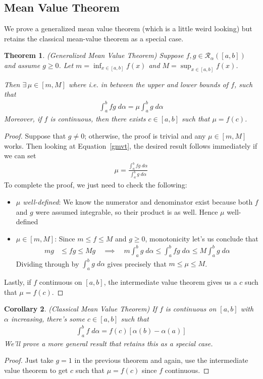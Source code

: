 \documentclass[12pt]{book}
\numberwithin{equation}{section} %
\theoremstyle{plain}
\newtheorem{thm}{Theorem}[section]
\newtheorem{cor}[thm]{Corollary}
\theoremstyle{definition}
\theoremstyle{remark}
\begin{document}
\newpage
\subsection{Mean Value Theorem}

We prove a generalized mean value theorem (which is a little weird
looking) but retains the classical mean-value theorem as a special case.

\begin{thm}\emph{(Generalized Mean Value Theorem)}
\label{mvt}
Suppose $f,g\in\mathscr{R}_\alpha([a,b])$ and assume $g\geq0$.
Let $m=\inf_{x\in[a,b]} f(x)$ and $M=\sup_{x\in[a,b]} f(x)$.

Then $\exists\,\mu\in[m,M]$ where i.e. in between the upper and lower
bounds of $f$, such that
\begin{align}
  \int^b_a fg\;d\alpha = \mu \int^b_a g\;d\alpha
  \label{gmvt}
\end{align}
Moreover, if $f$ is continuous, then there exists $c\in[a,b]$ such that
$\mu = f(c)$.
\end{thm}
\begin{proof}
Suppose that $g\neq 0$; otherwise, the proof is trivial and
any $\mu\in[m,M]$ works.
Then looking at Equation~\ref{gmvt}, the desired result follows
immediately if we can set
\begin{align*}
  \mu = \frac{\int^b_a fg\;d\alpha}{\int^b_a g\;d\alpha}
\end{align*}
To complete the proof, we just need to check the following:
\begin{itemize}
  \item
    \emph{$\mu$ well-defined}: We know the numerator and denominator
    exist because both $f$ and $g$ were assumed integrable, so their
    product is as well. Hence $\mu$ well-defined
  \item $\mu\in[m,M]$:
    Since $m\leq f \leq M$ and $g\geq0$, monotonicity let's us conclude
    that
    \begin{align}
      mg &\leq fg \leq Mg
      \quad\implies\quad
      m\int^b_a g\;d\alpha \leq
      \int^b_a fg\;d\alpha \leq  M \int^b_a g\;d\alpha
      \label{gmvtineq}
    \end{align}
    Dividing through by $\int^b_a g\;d\alpha$ gives precisely that
    $m\leq \mu\leq M$.
\end{itemize}
Lastly, if $f$ continuous on $[a,b]$, the intermediate value theorem
gives us a $c$ such that $\mu=f(c)$.
\end{proof}

\begin{cor}\emph{(Classical Mean Value Theorem)}
If $f$ is continuous on $[a,b]$ with $\alpha$ increasing, there's some
$c\in[a,b]$ such that
\begin{align*}
  \int^b_a f\;d\alpha = f(c)[\alpha(b)-\alpha(a)]
\end{align*}
We'll prove a more general result that retains this as a special case.
\end{cor}
\begin{proof}
Just take $g=1$ in the previous theorem and again, use the intermediate
value theorem to get $c$ such that $\mu=f(c)$ since $f$ continuous.
\end{proof}
\end{document}
